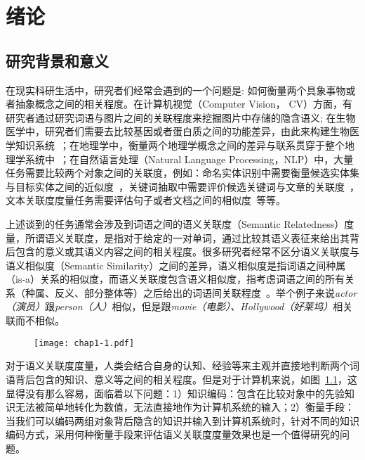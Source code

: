 \chapter{绪论}
\label{chap:chap01}

\section{研究背景和意义}
在现实科研生活中，研究者们经常会遇到的一个问题是: 如何衡量两个具象事物或者抽象概念之间的相关程度。在计算机视觉（Computer Vision， CV）方面，有研究者通过研究词语与图片之间的关联程度来挖掘图片中存储的隐含语义\cite{iwcs/LeongM11}; 在生物医学中，研究者们需要去比较基因或者蛋白质之间的功能差异，由此来构建生物医学知识系统~\cite{bib/GuzziMGC12,bmcbi/BenabderrahmaneSPND10}；在地理学中，衡量两个地理学概念之间的差异与联系贯穿于整个地理学系统中~\cite{josis/JanowiczRK11}；在自然语言处理（Natural Language Processing，NLP）中，大量任务需要比较两个对象之间的关联度，例如：命名实体识别中需要衡量候选实体集与目标实体之间的近似度~\cite{acl/HanZ10}，关键词抽取中需要评价候选关键词与文章的关联度~\cite{ijcai/ZhangFW13}，文本关联度度量任务需要评估句子或者文档之间的相似度~\cite{ijcai/YazdaniP13}等等。

上述谈到的任务通常会涉及到词语之间的语义关联度（Semantic Relatedness）度量，所谓语义关联度，是指对于给定的一对单词，通过比较其语义表征来给出其背后包含的意义或其语义内容之间的相关程度。很多研究者经常不区分语义关联度与语义相似度（Semantic Similarity）之间的差异，语义相似度是指词语之间种属（is-a）关系的相似度，而语义关联度包含语义相似度，指考虑词语之间的所有关系（种属、反义、部分整体等）之后给出的词语间关联程度~\cite{geoinformatica/BallatoreBW14}。举个例子来说\emph{actor（演员）}跟\emph{person（人）}相似，但是跟\emph{movie（电影）、Hollywood（好莱坞）}相关联而不相似。

\begin{figure}
    \centerline{\texttt{[image: chap1-1.pdf]}}
    \label{chap1-1}
\end{figure}

对于语义关联度度量，人类会结合自身的认知、经验等来主观并直接地判断两个词语背后包含的知识、意义等之间的相关程度。但是对于计算机来说，如图~\ref{chap1-1}，这显得没有那么容易，面临着以下问题：1）知识编码：包含在比较对象中的先验知识无法被简单地转化为数值，无法直接地作为计算机系统的输入；2）衡量手段：当我们可以编码两组对象背后隐含的知识并输入到计算机系统时，针对不同的知识编码方式，采用何种衡量手段来评估语义关联度度量效果也是一个值得研究的问题。

